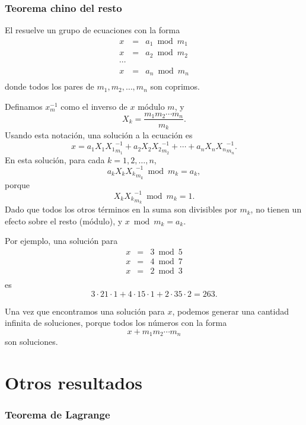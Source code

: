 \subsubsection{Teorema chino del resto}


El  resuelve un grupo de ecuaciones con la forma
\[
    \begin{array}{lcl}
        x & = & a_1 \bmod m_1 \\
        x & = & a_2 \bmod m_2 \\
        \cdots                \\
        x & = & a_n \bmod m_n \\
    \end{array}
\]
donde todos los pares de $m_1,m_2,\ldots,m_n$ son coprimos.

Definamos $x^{-1}_m$ como el inverso de $x$ módulo $m$, y
\[ X_k = \frac{m_1 m_2 \cdots m_n}{m_k}.\]
Usando esta notación, una solución a la ecuación es
\[x = a_1 X_1 {X_1}^{-1}_{m_1} + a_2 X_2 {X_2}^{-1}_{m_2} + \cdots + a_n X_n {X_n}^{-1}_{m_n}.\]
En esta solución, para cada $k=1,2,\ldots,n$,
\[a_k X_k {X_k}^{-1}_{m_k} \bmod m_k = a_k,\]
porque
\[X_k {X_k}^{-1}_{m_k} \bmod m_k = 1.\]
Dado que todos los otros términos en la suma son divisibles por $m_k$, no
tienen un efecto sobre el resto (módulo), y $x \bmod m_k = a_k$.

Por ejemplo, una solución para
\[
    \begin{array}{lcl}
        x & = & 3 \bmod 5 \\
        x & = & 4 \bmod 7 \\
        x & = & 2 \bmod 3 \\
    \end{array}
\]
es
\[ 3 \cdot 21 \cdot 1 + 4 \cdot 15 \cdot 1 + 2 \cdot 35 \cdot 2 = 263.\]

Una vez que encontramos una solución para $x$, podemos generar una cantidad
infinita de soluciones, porque todos los números con la forma
\[x+m_1 m_2 \cdots m_n\] son soluciones.

\section{Otros resultados}

\subsubsection{Teorema de Lagrange}

